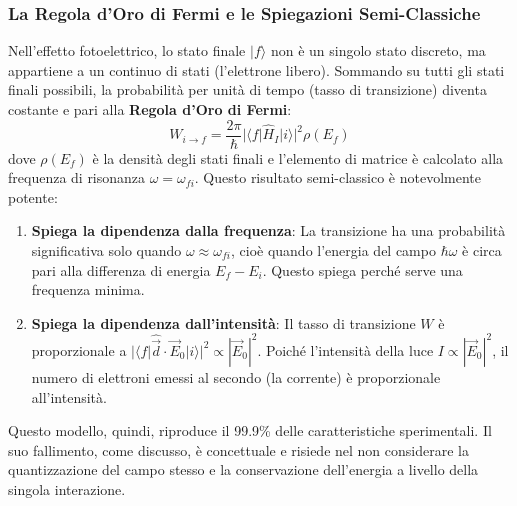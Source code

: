 \subsubsection*{La Regola d'Oro di Fermi e le Spiegazioni Semi-Classiche}
Nell'effetto fotoelettrico, lo stato finale $|f\rangle$ non è un singolo stato discreto, ma appartiene a un continuo di stati (l'elettrone libero). Sommando su tutti gli stati finali possibili, la probabilità per unità di tempo (tasso di transizione) diventa costante e pari alla \textbf{Regola d'Oro di Fermi}:
\begin{equation}
W_{i\to f} = \frac{2\pi}{\hbar} |\langle f | \hat{H}_I | i \rangle|^2 \rho(E_f)
\end{equation}
dove $\rho(E_f)$ è la densità degli stati finali e l'elemento di matrice è calcolato alla frequenza di risonanza $\omega = \omega_{fi}$.
Questo risultato semi-classico è notevolmente potente:
\begin{enumerate}
    \item \textbf{Spiega la dipendenza dalla frequenza}: La transizione ha una probabilità significativa solo quando $\omega \approx \omega_{fi}$, cioè quando l'energia del campo $\hbar\omega$ è circa pari alla differenza di energia $E_f - E_i$. Questo spiega perché serve una frequenza minima.
    \item \textbf{Spiega la dipendenza dall'intensità}: Il tasso di transizione $W$ è proporzionale a $|\langle f | \hat{\vec{d}} \cdot \vec{E}_0 | i \rangle|^2 \propto |\vec{E}_0|^2$. Poiché l'intensità della luce $I \propto |\vec{E}_0|^2$, il numero di elettroni emessi al secondo (la corrente) è proporzionale all'intensità.
\end{enumerate}
Questo modello, quindi, riproduce il 99.9\% delle caratteristiche sperimentali. Il suo fallimento, come discusso, è concettuale e risiede nel non considerare la quantizzazione del campo stesso e la conservazione dell'energia a livello della singola interazione.
